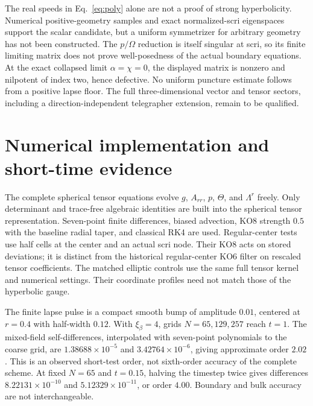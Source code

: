 \documentclass[11pt]{article}
\begin{document}
The real speeds in Eq.~\eqref{eq:poly} alone are not a proof of strong hyperbolicity. Numerical positive-geometry samples and exact normalized-scri eigenspaces support the scalar candidate, but a uniform symmetrizer for arbitrary geometry has not been constructed. The $p/\Omega$ reduction is itself singular at scri, so its finite limiting matrix does not prove well-posedness of the actual boundary equations. At the exact collapsed limit $\alpha=\chi=0$, the displayed matrix is nonzero and nilpotent of index two, hence defective. No uniform puncture estimate follows from a positive lapse floor. The full three-dimensional vector and tensor sectors, including a direction-independent telegrapher extension, remain to be qualified.

\section{Numerical implementation and short-time evidence}
The complete spherical tensor equations evolve $g$, $A_{rr}$, $p$, $\Theta$, and $\Lambda^r$ freely. Only determinant and trace-free algebraic identities are built into the spherical tensor representation. Seven-point finite differences, biased advection, KO8 strength $0.5$ with the baseline radial taper, and classical RK4 are used. Regular-center tests use half cells at the center and an actual scri node. Their KO8 acts on stored deviations; it is distinct from the historical regular-center KO6 filter on rescaled tensor coefficients. The matched elliptic controls use the same full tensor kernel and numerical settings. Their coordinate profiles need not match those of the hyperbolic gauge.

The finite lapse pulse is a compact smooth bump of amplitude $0.01$, centered at $r=0.4$ with half-width $0.12$. With $\xi_\beta=4$, grids $N=65,129,257$ reach $t=1$. The mixed-field self-differences, interpolated with seven-point polynomials to the coarse grid, are $1.38688\times10^{-5}$ and $3.42764\times10^{-6}$, giving approximate order $2.02$. This is an observed short-test order, not sixth-order accuracy of the complete scheme. At fixed $N=65$ and $t=0.15$, halving the timestep twice gives differences $8.22131\times10^{-10}$ and $5.12329\times10^{-11}$, or order $4.00$. Boundary and bulk accuracy are not interchangeable.
\end{document}
